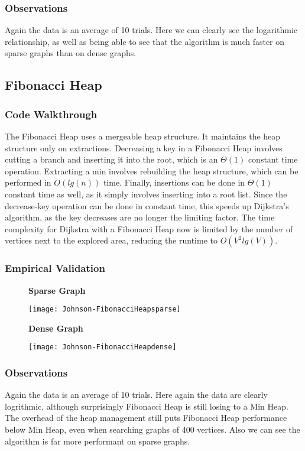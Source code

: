 \documentclass[a4paper,12pt]{article}
\begin{document}
\subsubsection{Observations}
Again the data is an average of 10 trials. Here we can clearly see the logarithmic relationship, as well as being able to see that the algorithm is much faster on sparse graphs than on dense graphs.
\subsection{Fibonacci Heap}
\subsubsection{Code Walkthrough}

The Fibonacci Heap uses a mergeable heap structure. It maintains the heap structure only on extractions. Decreasing a key in a Fibonacci Heap involves cutting a branch and inserting it into the root, which is an $\Theta(1)$ constant time operation. Extracting a min involves rebuilding the heap structure, which can be performed in $O(lg(n))$ time. Finally, insertions can be done in $\Theta(1)$ constant time as well, as it simply involves inserting into a root list. Since the decrease-key operation can be done in constant time, this speeds up Dijkstra's algorithm, as the key decreases are no longer the limiting factor. The time complexity for Dijkstra with a Fibonacci Heap now is limited by the number of vertices next to the explored area, reducing the runtime to $O(V^2lg(V))$.
\subsubsection{Empirical Validation}
\begin{figure}[H]
  \centering
  \textbf{Sparse Graph}\par\medskip
  \texttt{[image: Johnson-FibonacciHeapsparse]}
\end{figure}
\begin{figure}[H]
  \centering
  \textbf{Dense Graph}\par\medskip
  \texttt{[image: Johnson-FibonacciHeapdense]}
\end{figure}
\subsubsection{Observations}
Again the data is an average of 10 trials. Here again the data are clearly logrithmic, although surprisingly Fibonacci Heap is still losing to a Min Heap. The overhead of the heap management still puts Fibonacci Heap performance below Min Heap, even when searching graphs of 400 vertices. Also we can see the algorithm is far more performant on sparse graphs.
\end{document}
